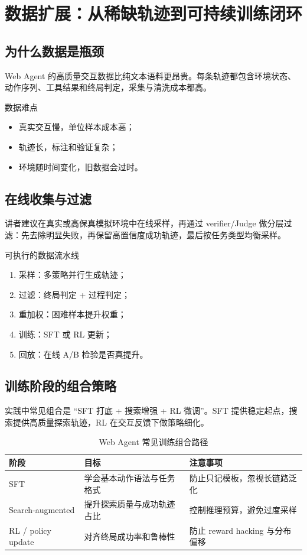\section{数据扩展：从稀缺轨迹到可持续训练闭环}

\subsection{为什么数据是瓶颈}
Web Agent 的高质量交互数据比纯文本语料更昂贵。每条轨迹都包含环境状态、动作序列、工具结果和终局判定，采集与清洗成本都高。

\begin{importantbox}{数据难点}
\begin{itemize}
    \item 真实交互慢，单位样本成本高；
    \item 轨迹长，标注和验证复杂；
    \item 环境随时间变化，旧数据会过时。
\end{itemize}
\end{importantbox}

\subsection{在线收集与过滤}
讲者建议在真实或高保真模拟环境中在线采样，再通过 verifier/Judge 做分层过滤：先去除明显失败，再保留高置信度成功轨迹，最后按任务类型均衡采样。

\begin{knowledgebox}{可执行的数据流水线}
\begin{enumerate}
    \item 采样：多策略并行生成轨迹；
    \item 过滤：终局判定 + 过程判定；
    \item 重加权：困难样本提升权重；
    \item 训练：SFT 或 RL 更新；
    \item 回放：在线 A/B 检验是否真提升。
\end{enumerate}
\end{knowledgebox}

\subsection{训练阶段的组合策略}
实践中常见组合是 ``SFT 打底 + 搜索增强 + RL 微调''。SFT 提供稳定起点，搜索提供高质量探索轨迹，RL 在交互反馈下做策略细化。

\begin{table}[H]
\centering
\small
\begin{tabular}{p{2.4cm}p{3.9cm}p{4.7cm}}
\toprule
\textbf{阶段} & \textbf{目标} & \textbf{注意事项} \\
\midrule
SFT & 学会基本动作语法与任务格式 & 防止只记模板，忽视长链路泛化 \\
Search-augmented & 提升探索质量与成功轨迹占比 & 控制推理预算，避免过度采样 \\
RL / policy update & 对齐终局成功率和鲁棒性 & 防止 reward hacking 与分布偏移 \\
\bottomrule
\end{tabular}
\caption{Web Agent 常见训练组合路径}
\end{table}

